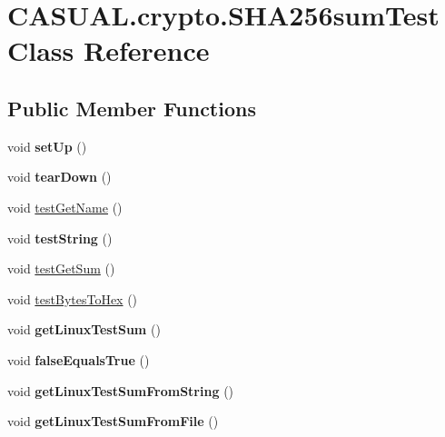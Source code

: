 \hypertarget{classCASUAL_1_1crypto_1_1SHA256sumTest}{\section{C\-A\-S\-U\-A\-L.\-crypto.\-S\-H\-A256sum\-Test Class Reference}
\label{classCASUAL_1_1crypto_1_1SHA256sumTest}
}
\subsection*{Public Member Functions}
\begin{DoxyCompactItemize}
\item 
\hypertarget{classCASUAL_1_1crypto_1_1SHA256sumTest_a47ee188a29eff12683da6c241a2cc5d0}{void {\bfseries set\-Up} ()}\label{classCASUAL_1_1crypto_1_1SHA256sumTest_a47ee188a29eff12683da6c241a2cc5d0}

\item 
\hypertarget{classCASUAL_1_1crypto_1_1SHA256sumTest_a133bfddcf23c02f7682b54c159766c7d}{void {\bfseries tear\-Down} ()}\label{classCASUAL_1_1crypto_1_1SHA256sumTest_a133bfddcf23c02f7682b54c159766c7d}

\item 
void \hyperlink{classCASUAL_1_1crypto_1_1SHA256sumTest_aa32bc5a04f72608f889b6fa3d9137864}{test\-Get\-Name} ()
\item 
\hypertarget{classCASUAL_1_1crypto_1_1SHA256sumTest_a6d7d1acf6c4e51509ae4ae44a7f413e2}{void {\bfseries test\-String} ()}\label{classCASUAL_1_1crypto_1_1SHA256sumTest_a6d7d1acf6c4e51509ae4ae44a7f413e2}

\item 
void \hyperlink{classCASUAL_1_1crypto_1_1SHA256sumTest_aa64bfb4fd5c838fb57fa854ae88e616c}{test\-Get\-Sum} ()
\item 
void \hyperlink{classCASUAL_1_1crypto_1_1SHA256sumTest_a312c80659b205ac950704ea54c51d648}{test\-Bytes\-To\-Hex} ()
\item 
\hypertarget{classCASUAL_1_1crypto_1_1SHA256sumTest_ad48c86e6a4af45643ffe4059b2e69127}{void {\bfseries get\-Linux\-Test\-Sum} ()}\label{classCASUAL_1_1crypto_1_1SHA256sumTest_ad48c86e6a4af45643ffe4059b2e69127}

\item 
\hypertarget{classCASUAL_1_1crypto_1_1SHA256sumTest_a892d1f9d57ea82598025227cfa9f9364}{void {\bfseries false\-Equals\-True} ()}\label{classCASUAL_1_1crypto_1_1SHA256sumTest_a892d1f9d57ea82598025227cfa9f9364}

\item 
\hypertarget{classCASUAL_1_1crypto_1_1SHA256sumTest_a5251d3dc892ae7ccf10bdc31cfe988bc}{void {\bfseries get\-Linux\-Test\-Sum\-From\-String} ()}\label{classCASUAL_1_1crypto_1_1SHA256sumTest_a5251d3dc892ae7ccf10bdc31cfe988bc}

\item 
\hypertarget{classCASUAL_1_1crypto_1_1SHA256sumTest_a5a7da46a949a3cd9b21d93ae2f4401a4}{void {\bfseries get\-Linux\-Test\-Sum\-From\-File} ()}\label{classCASUAL_1_1crypto_1_1SHA256sumTest_a5a7da46a949a3cd9b21d93ae2f4401a4}

\end{DoxyCompactItemize}
